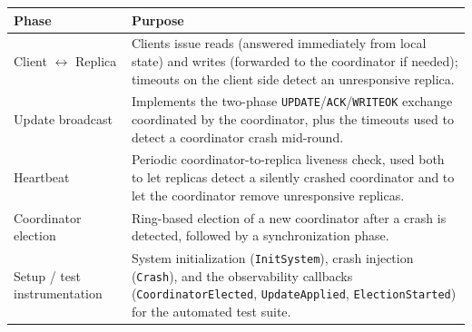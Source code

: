 \begin{center}
\small
\begin{tabular}{|C{2.8cm}|C{13cm}|}
\hline
\textbf{Phase} & \textbf{Purpose} \\
\hline
Client $\leftrightarrow$ Replica &
  Clients issue reads (answered immediately from local state) and writes (forwarded to the
  coordinator if needed); timeouts on the client side detect an unresponsive replica. \\
\hline
Update broadcast &
  Implements the two-phase \texttt{UPDATE}/\texttt{ACK}/\texttt{WRITEOK} exchange coordinated by the
  coordinator, plus the timeouts used to detect a coordinator crash mid-round. \\
\hline
Heartbeat &
  Periodic coordinator-to-replica liveness check, used both to let replicas detect a silently
  crashed coordinator and to let the coordinator remove unresponsive replicas. \\
\hline
Coordinator election &
  Ring-based election of a new coordinator after a crash is detected, followed by a synchronization
  phase. \\
\hline
Setup / test instrumentation &
  System initialization (\texttt{InitSystem}), crash injection (\texttt{Crash}), and the
  observability callbacks (\texttt{CoordinatorElected}, \texttt{UpdateApplied},
  \texttt{ElectionStarted}) for the automated test suite.\\
\hline
\end{tabular}
\end{center}